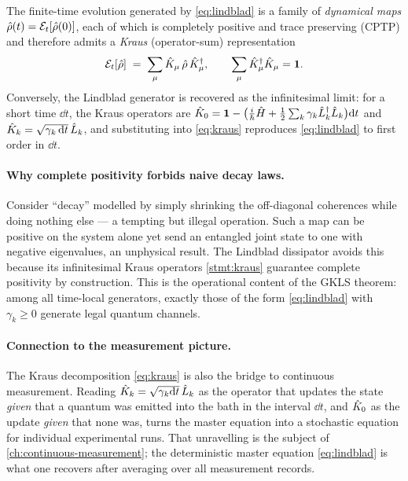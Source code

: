 \begin{statement}
\label{stmt:kraus}
The finite-time evolution generated by \cref{eq:lindblad} is a
family of \emph{dynamical maps} $\hat{\rho}(t)=\mathcal E_t[\hat{\rho}(0)]$,
each of which is completely positive and trace preserving (CPTP)
and therefore admits a \emph{Kraus} (operator-sum) representation
\begin{equation}
\label{eq:kraus}
\mathcal E_t[\hat{\rho}] \;=\; \sum_\mu \hat{K}_\mu\,\hat{\rho}\,\hat{K}_\mu^\dagger,
\qquad \sum_\mu \hat{K}_\mu^\dagger\hat{K}_\mu = \mathbf{1}.
\end{equation}
Conversely, the Lindblad generator is recovered as the
infinitesimal limit: for a short time $\dd t$, the Kraus operators
are $\hat{K}_0=\mathbf{1}-\bigl(\tfrac{i}{\hbar}\hat{H}+\tfrac12\sum_k\gamma_k\hat{L}_k^\dagger\hat{L}_k\bigr)\dd t$
and $\hat{K}_k=\sqrt{\gamma_k\,\dd t}\,\hat{L}_k$, and substituting into
\cref{eq:kraus} reproduces \cref{eq:lindblad} to first order in
$\dd t$.
\end{statement}

\paragraph{Why complete positivity forbids naive decay laws.}
Consider ``decay'' modelled by simply shrinking the off-diagonal
coherences while doing nothing else --- a tempting but illegal
operation. Such a map can be positive on the system alone yet send
an entangled joint state to one with negative eigenvalues, an
unphysical result. The Lindblad dissipator avoids this because its
infinitesimal Kraus operators \cref{stmt:kraus} guarantee complete
positivity by construction. This is the operational content of the
GKLS theorem: among all time-local generators, exactly those of the
form \cref{eq:lindblad} with $\gamma_k\geq 0$ generate legal
quantum channels.

\paragraph{Connection to the measurement picture.}
The Kraus decomposition \cref{eq:kraus} is also the bridge to
continuous measurement. Reading $\hat{K}_k=\sqrt{\gamma_k\dd t}\,\hat{L}_k$
as the operator that updates the state \emph{given} that a quantum
was emitted into the bath in the interval $\dd t$, and
$\hat{K}_0$ as the update \emph{given} that none was, turns the
master equation into a stochastic equation for individual
experimental runs. That unravelling is the subject of
\cref{ch:continuous-measurement}; the deterministic master equation
\cref{eq:lindblad} is what one recovers after averaging over all
measurement records.

